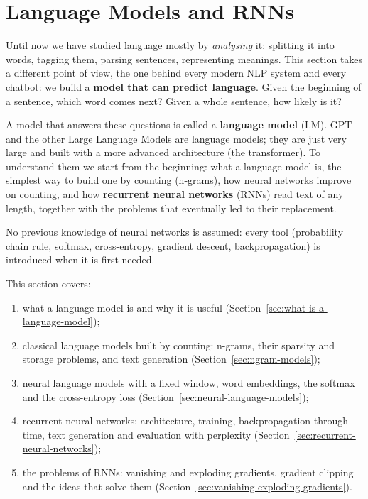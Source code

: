 \section{Language Models and RNNs}
\label{sec:language-models}

Until now we have studied language mostly by \emph{analysing} it: splitting it into
words, tagging them, parsing sentences, representing meanings. This section takes a
different point of view, the one behind every modern NLP system and every chatbot:
we build a \textbf{model that can predict language}. Given the beginning of a
sentence, which word comes next? Given a whole sentence, how likely is it?

A model that answers these questions is called a \textbf{language model} (LM). GPT and
the other Large Language Models are language models; they are just very large and
built with a more advanced architecture (the transformer). To understand them we
start from the beginning: what a language model is, the simplest way to build one by
counting (n-grams), how neural networks improve on counting, and how
\textbf{recurrent neural networks} (RNNs) read text of any length, together with the
problems that eventually led to their replacement.

No previous knowledge of neural networks is assumed: every tool (probability chain
rule, softmax, cross-entropy, gradient descent, backpropagation) is introduced when it
is first needed.

This section covers:
\begin{enumerate}[nosep]
  \item what a language model is and why it is useful
        (Section~\ref{sec:what-is-a-language-model});
  \item classical language models built by counting: n-grams, their sparsity and
        storage problems, and text generation (Section~\ref{sec:ngram-models});
  \item neural language models with a fixed window, word embeddings, the softmax and
        the cross-entropy loss (Section~\ref{sec:neural-language-models});
  \item recurrent neural networks: architecture, training, backpropagation through
        time, text generation and evaluation with perplexity
        (Section~\ref{sec:recurrent-neural-networks});
  \item the problems of RNNs: vanishing and exploding gradients, gradient clipping and
        the ideas that solve them (Section~\ref{sec:vanishing-exploding-gradients}).
\end{enumerate}






